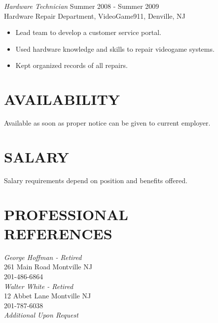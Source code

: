 \documentclass[line,margin]{res}
\begin{document}
\begin{resume}
	{\sl Hardware Technician} \hfill            Summer 2008 - Summer 2009 \\
	Hardware Repair Department, VideoGame911, Denville, NJ
	\begin{itemize}  \itemsep -2pt
		\item Lead team to develop a customer service portal. 
		\item Used hardware knowledge and skills to repair videogame systems. 
		\item Kept organized records of all repairs. 
	\end{itemize} 

\section{AVAILABILITY}
	Available as soon as proper notice can be given to current employer.

\section {SALARY}
	Salary requirements depend on position and benefits offered.

\section{PROFESSIONAL \\ REFERENCES}
	{\sl George Hoffman - Retired } \\
	261 Main Road Montville NJ \\
	201-486-6864 \\
 
	{\sl Walter White - Retired } \\
	12 Abbet Lane Montville NJ \\
	201-787-6038 \\

	{\sl Additional Upon Request}

\end{resume}
\end{document}
